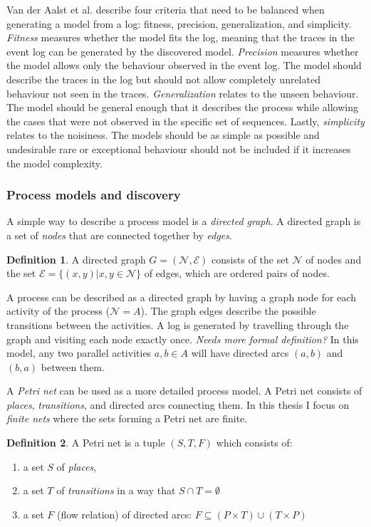 \documentclass[english,12pt,a4paper,pdftex,sci,utf8]{aaltothesis}
\theoremstyle{definition}
\newtheorem{definition}{Definition}
\newcommand{\nyi}[1]{\noindent\colorbox{nyibg}{\textcolor{nyitext}{\emph{#1}}}}
\begin{document}
Van der Aalst et al. \cite{van2013discovering} describe four criteria that need to be balanced when generating a model from a log: fitness, precision, generalization, and simplicity.
\emph{Fitness} measures whether the model fits the log, meaning that the traces in the event log can be generated by the discovered model.
\emph{Precision} measures whether the model allows only the behaviour observed in the event log. The model should describe the traces in the log but should not allow completely unrelated behaviour not seen in the traces.
\emph{Generalization} relates to the unseen behaviour. The model should be general enough that it describes the process while allowing the cases that were not observed in the specific set of sequences.
Lastly, \emph{simplicity} relates to the noisiness. The models should be as simple as possible and undesirable rare or exceptional behaviour should not be included if it increases the model complexity.


\subsubsection{Process models and discovery}

A simple way to describe a process model is a \emph{directed graph}. A directed graph is a set of \emph{nodes} that are connected together by \emph{edges}. 

\begin{definition}
A directed graph $G = (\mathcal{N}, \mathcal{E})$ consists of the set $\mathcal{N}$ of nodes and the set $\mathcal{E} = \{ (x,y) | x,y \in \mathcal{N} \} $ of edges, which are ordered pairs of nodes.
\end{definition}

A process can be described as a directed graph by having a graph node for each activity of the process ($\mathcal{N} = A$). The graph edges describe the possible transitions between the activities.
A log is generated by travelling through the graph and visiting each node exactly once. \nyi{Needs more formal definition?}
In this model, any two parallel activities $a, b \in A$ will have directed arcs $(a,b)$ and $(b,a)$ between them.

A \emph{Petri net} \cite{rozenberg1998lectures} can be used as a more detailed process model. A Petri net consists of \emph{places}, \emph{transitions}, and directed arcs connecting them. In this thesis I focus on \emph{finite nets} where the sets forming a Petri net are finite.

\begin{definition}
A Petri net is a tuple $(S, T, F)$ which consists of:
\begin{enumerate}
    \item a set $S$ of \emph{places},
    \item a set $T$ of \emph{transitions} in a way that $S \cap T = \emptyset$
    \item a set $F$ (flow relation) of directed arcs: $F \subseteq (P \times T) \cup (T \times P)$ 
\end{enumerate}
\end{definition}
\end{document}
